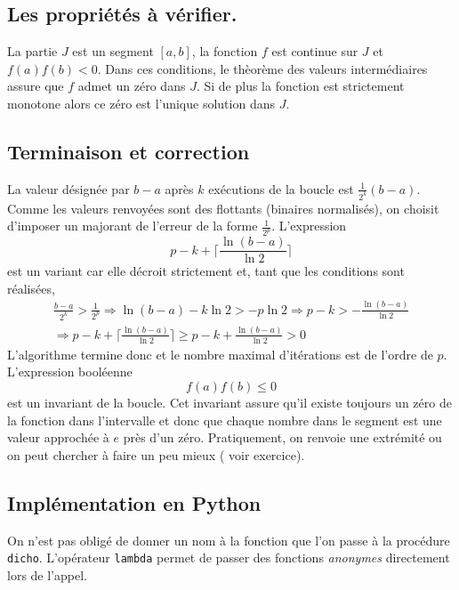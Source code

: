 \subsection{Les propriétés à vérifier.}
La partie $J$ est un segment $[a,b]$, la fonction $f$ est continue sur $J$ et $f(a)f(b)<0$. Dans ces conditions, le thèorème des valeurs intermédiaires assure que $f$ admet un zéro dans $J$. Si de plus la fonction est strictement monotone alors ce zéro est l'unique solution dans $J$. 

\subsection{Terminaison et correction}
La valeur désignée par $b-a$ après $k$ exécutions de la boucle est $\frac{1}{2^k}(b-a)$. Comme les valeurs renvoyées sont des flottants (binaires normalisés), on choisit d'imposer un majorant de l'erreur de la forme $\frac{1}{2^p}$. L'expression 
\begin{displaymath}
p-k + \lceil \frac{\ln(b-a)}{\ln 2}\rceil  
\end{displaymath}
 est  un variant car elle décroit strictement et, tant que les conditions sont réalisées,
\begin{multline*}
  \frac{b-a}{2^k} >\frac{1}{2^p} \Rightarrow 
  \ln(b-a) - k\ln 2 > -p\ln 2 \Rightarrow p-k > -\frac{\ln(b-a)}{\ln 2} \\
  \Rightarrow p-k + \lceil \frac{\ln(b-a)}{\ln 2}\rceil \geq p-k + \frac{\ln(b-a)}{\ln 2} >0
\end{multline*}
L'algorithme termine donc et le nombre maximal d'itérations est de l'ordre de $p$.
L'expression booléenne
\begin{displaymath}
  f(a)f(b)\leq 0
\end{displaymath}
est un invariant de la boucle. Cet invariant assure qu'il existe toujours un zéro de la fonction dans l'intervalle et donc que chaque nombre dans le segment est une valeur approchée à $e$ près d'un zéro. Pratiquement, on renvoie une extrémité ou on peut chercher à faire un peu mieux ( voir exercice).

\subsection{Implémentation en Python}

On n'est pas obligé de donner un nom à la fonction que l'on passe à la procédure \texttt{dicho}. L'opérateur \texttt{lambda} permet de passer des fonctions \emph{anonymes} directement lors de l'appel.


